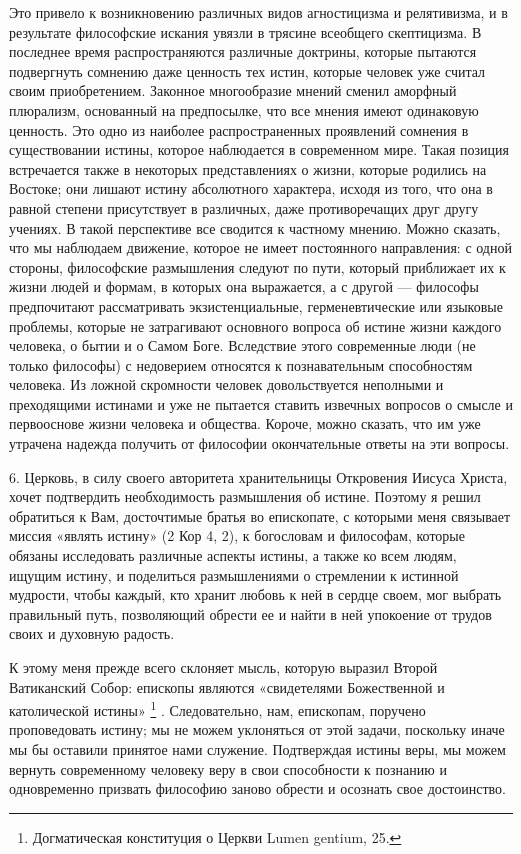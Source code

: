 \documentclass[a5paper,10pt]{article}
\begin{document}
Это привело к возникновению различных видов агностицизма и релятивизма, и в
результате философские искания увязли в трясине всеобщего скептицизма. В
последнее время распространяются различные доктрины, которые пытаются
подвергнуть сомнению даже ценность тех истин, которые человек уже считал своим
приобретением. Законное многообразие мнений сменил аморфный плюрализм,
основанный на предпосылке, что все мнения имеют одинаковую ценность. Это одно
из наиболее распространенных проявлений сомнения в существовании истины,
которое наблюдается в современном мире. Такая позиция встречается также в
некоторых представлениях о жизни, которые родились на Востоке; они лишают
истину абсолютного характера, исходя из того, что она в равной степени
присутствует в различных, даже противоречащих друг другу учениях. В такой
перспективе все сводится к частному мнению. Можно сказать, что мы наблюдаем
движение, которое не имеет постоянного направления: с одной стороны,
философские размышления следуют по пути, который приближает их к жизни людей и
формам, в которых она выражается, а с другой — философы предпочитают
рассматривать экзистенциальные, герменевтические или языковые проблемы, которые
не затрагивают основного вопроса об истине жизни каждого человека, о бытии и о
Самом Боге. Вследствие этого современные люди (не только философы) с недоверием
относятся к познавательным способностям человека. Из ложной скромности человек
довольствуется неполными и преходящими истинами и уже не пытается ставить
извечных вопросов о смысле и первооснове жизни человека и общества. Короче,
можно сказать, что им уже утрачена надежда получить от философии окончательные
ответы на эти вопросы.

6. Церковь, в силу своего авторитета хранительницы Откровения Иисуса Христа,
хочет подтвердить необходимость размышления об истине. Поэтому я решил
обратиться к Вам, досточтимые братья во епископате, с которыми меня связывает
миссия «являть истину» (2 Кор 4, 2), к богословам и философам, которые обязаны
исследовать различные аспекты истины, а также ко всем людям, ищущим истину, и
поделиться размышлениями о стремлении к истинной мудрости, чтобы каждый, кто
хранит любовь к ней в сердце своем, мог выбрать правильный путь, позволяющий
обрести ее и найти в ней упокоение от трудов своих и духовную радость.

К этому меня прежде всего склоняет мысль, которую выразил Второй Ватиканский
Собор: епископы являются «свидетелями Божественной и католической истины»
\footnote{Догматическая конституция о Церкви Lumen gentium, 25.} .
Следовательно, нам, епископам, поручено проповедовать истину; мы не можем
уклоняться от этой задачи, поскольку иначе мы бы оставили принятое нами
служение. Подтверждая истины веры, мы можем вернуть современному человеку веру
в свои способности к познанию и одновременно призвать философию заново обрести
и осознать свое достоинство.
\end{document}
